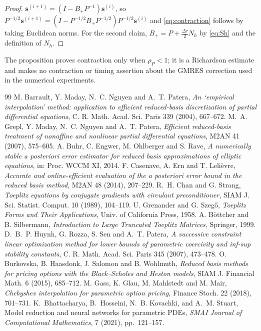 \documentclass[11pt]{amsart}
\theoremstyle{remark}
\newcommand{\dt}{\Delta\tau}
\newcommand{\sres}{\mathbf s}
\begin{document}
\begin{proof}
$\sres^{(i+1)}=(I-B_+P^{-1})\sres^{(i)}$, so
$P^{-1/2}\sres^{(i+1)}=(I-P^{-1/2}B_+P^{-1/2})P^{-1/2}\sres^{(i)}$ and
\eqref{eq:contraction} follows by taking Euclidean norms.  For the second
claim, $B_+=P+\tfrac{\dt}{2}N_h$ by \eqref{eq:Sh} and the definition of $N_h$.
\end{proof}
The proposition proves contraction only when $\rho_P<1$; it is a
Richardson estimate and makes no contraction or timing assertion about the
GMRES correction used in the numerical experiments.
\FloatBarrier
\begin{thebibliography}{99}
M. Barrault, Y. Maday, N.~C. Nguyen and A.~T. Patera, \emph{An `empirical interpolation' method:
application to efficient reduced-basis discretization of partial differential equations},
C. R. Math. Acad. Sci. Paris 339 (2004), 667--672.
M.~A. Grepl, Y. Maday, N.~C. Nguyen and A.~T. Patera, \emph{Efficient reduced-basis treatment of
nonaffine and nonlinear partial differential equations}, M2AN 41 (2007), 575--605.
A. Buhr, C. Engwer, M. Ohlberger and S. Rave, \emph{A numerically stable a posteriori error
estimator for reduced basis approximations of elliptic equations}, in: Proc. WCCM XI, 2014.
F. Casenave, A. Ern and T. Leli\`evre, \emph{Accurate and online-efficient evaluation of the a
posteriori error bound in the reduced basis method}, M2AN 48 (2014), 207--229.
R.~H. Chan and G. Strang, \emph{Toeplitz equations by conjugate gradients with circulant
preconditioner}, SIAM J. Sci. Statist. Comput. 10 (1989), 104--119.
U. Grenander and G. Szeg\H{o}, \emph{Toeplitz Forms and Their Applications}, Univ. of California Press, 1958.
A. B\"ottcher and B. Silbermann, \emph{Introduction to Large Truncated Toeplitz Matrices}, Springer, 1999.
D.~B.~P. Huynh, G. Rozza, S. Sen and A.~T. Patera, \emph{A successive constraint linear optimization
method for lower bounds of parametric coercivity and inf-sup stability constants},
C. R. Math. Acad. Sci. Paris 345 (2007), 473--478.
O. Burkovska, B. Haasdonk, J. Salomon and B. Wohlmuth, \emph{Reduced basis methods for pricing
options with the Black--Scholes and Heston models}, SIAM J. Financial Math. 6 (2015), 685--712.
M. Gass, K. Glau, M. Mahlstedt and M. Mair, \emph{Chebyshev interpolation for parametric option
pricing}, Finance Stoch. 22 (2018), 701--731.
K.~Bhattacharya, B.~Hosseini, N.~B. Kovachki, and A.~M. Stuart,
\newblock Model reduction and neural networks for parametric PDEs,
\newblock \emph{SMAI Journal of Computational Mathematics}, 7 (2021),
pp.~121--157.


\end{thebibliography}
\end{document}
